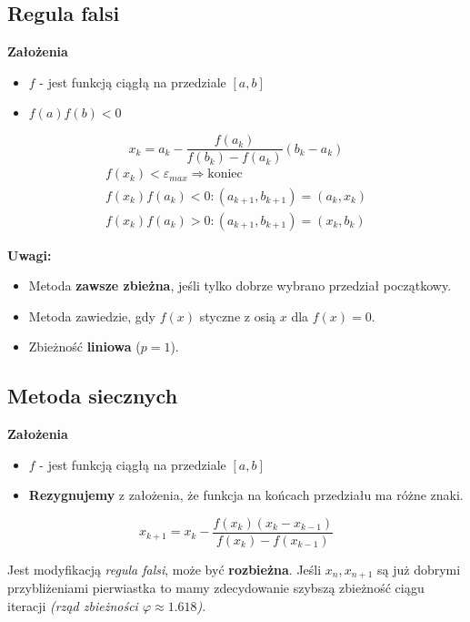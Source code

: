 \documentclass[../mn-notatki.tex]{subfiles}
\begin{document}
\subsection{Regula falsi}

\textbf{Założenia}
\begin{itemize}
    \item $f$ - jest funkcją ciągłą na przedziale $[a,b]$
    \item $f(a)f(b) < 0$\\
\end{itemize}

\begin{tcolorbox}
\[
x_k = a_k - \frac{f(a_k)}{f(b_k) - f(a_k)}(b_k - a_k)
\]
\begin{gather*}
f(x_k) < \varepsilon_{max} \Longrightarrow \text{koniec}\\
f(x_k)f(a_k) < 0 : (a_{k+1}, b_{k+1}) = (a_k, x_k)\\
f(x_k)f(a_k) > 0 : (a_{k+1}, b_{k+1}) = (x_k, b_k)
\end{gather*}
\end{tcolorbox}

\textbf{Uwagi:}
\begin{itemize}
    \item Metoda \textbf{zawsze zbieżna}, jeśli tylko dobrze wybrano przedział
    początkowy.
    \item Metoda zawiedzie, gdy $f(x)$ styczne z osią $x$ dla $f(x) = 0$.
    \item Zbieżność \textbf{liniowa} ($p = 1$).
\end{itemize}


\subsection{Metoda siecznych}

\textbf{Założenia}
\begin{itemize}
    \item $f$ - jest funkcją ciągłą na przedziale $[a,b]$
    \item \textbf{Rezygnujemy} z założenia, że funkcja na końcach przedziału
    ma różne znaki.
\end{itemize}

\begin{tcolorbox}
\[
x_{k+1} = x_k - \frac{f(x_k)(x_k - x_{k-1})}{f(x_k) - f(x_{k-1})}
\]
\end{tcolorbox}

Jest modyfikacją \textit{regula falsi}, może być \textbf{rozbieżna}.
Jeśli $x_n, x_{n+1}$ są już
dobrymi przybliżeniami pierwiastka to mamy zdecydowanie szybszą zbieżność ciągu
iteracji \textit{(rząd zbieżności $\varphi \approx 1.618 $)}.
\end{document}
